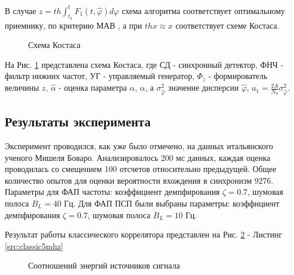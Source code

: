 В случае ${z=th \int_{t_k}^t F_1(t, \hat{\varphi}) \hat{d\varphi}}$ схема алгоритма соответствует оптимальному приемнику, по критерию МАВ \cite{shahtarin-wiener-kalman}, а при ${thx \approx x}$
соответствует схеме Костаса.

\begin{figure}[h]
\center{}
	\caption{Схема Костаса}
	\label{pic:sec4_costas}
\end{figure}

На Рис. \ref{pic:sec4_costas} представлена схема Костаса, где СД - синхронный детектор, ФНЧ - фильтр нижних частот, УГ - управляемый генератор, ${\Phi_z}$ - формирователь величины ${z}$,
${\hat{\alpha}}$ - оценка параметра ${\alpha}$, ${\alpha}$, а ${\sigma_{\hat{\varphi}}^2}$ значение дисперсии ${\hat{\varphi}}$, ${a_1 = \frac{2A}{N_0} \sigma_{\hat{\varphi}}^2}$.

\subsection{Результаты эксперимента}

Эксперимент проводился, как уже было отмечено, на данных итальянского ученого Мишеля Боваро. Анализировалось 200 мс данных, каждая оценка проводилась со смещением 100 отсчетов относительно
предыдущей. Общее количество опытов для оценки вероятности вхождения в синхронизм 9276. Параметры для ФАП частоты: коэффициент демпфирования ${\zeta=0.7}$, шумовая полоса  ${B_L=40}$ Гц.
Для ФАП ПСП были выбраны параметры: коэффициент демпфирования ${\zeta=0.7}$, шумовая полоса  ${B_L=10}$ Гц.

Результат работы классического коррелятора представлен на Рис. \ref{pic:5mhz_sats_all} - Листинг \ref{src:classic5mhz}
\begin{figure}[h]
\center{}
	\caption{Соотношений энергий источников сигнала}
	\label{pic:5mhz_sats_all}
\end{figure}

